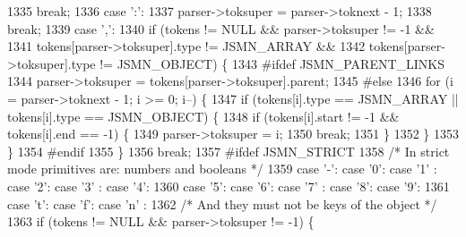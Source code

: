 \begin{DoxyCode}
1335                 \textcolor{keywordflow}{break};
1336             \textcolor{keywordflow}{case} \textcolor{charliteral}{':'}:
1337                 parser->toksuper = parser->toknext - 1;
1338                 \textcolor{keywordflow}{break};
1339             \textcolor{keywordflow}{case} \textcolor{charliteral}{','}:
1340                 \textcolor{keywordflow}{if} (tokens != NULL && parser->toksuper != -1 &&
1341                         tokens[parser->toksuper].type != JSMN_ARRAY &&
1342                         tokens[parser->toksuper].type != JSMN_OBJECT) \{
1343 \textcolor{preprocessor}{#ifdef JSMN\_PARENT\_LINKS}
1344                     parser->toksuper = tokens[parser->toksuper].parent;
1345 \textcolor{preprocessor}{#else}
1346                     \textcolor{keywordflow}{for} (i = parser->toknext - 1; i >= 0; i--) \{
1347                         \textcolor{keywordflow}{if} (tokens[i].type == JSMN_ARRAY || tokens[i].type == 
      JSMN_OBJECT) \{
1348                             \textcolor{keywordflow}{if} (tokens[i].start != -1 && tokens[i].end == -1) \{
1349                                 parser->toksuper = i;
1350                                 \textcolor{keywordflow}{break};
1351                             \}
1352                         \}
1353                     \}
1354 \textcolor{preprocessor}{#endif}
1355                 \}
1356                 \textcolor{keywordflow}{break};
1357 \textcolor{preprocessor}{#ifdef JSMN\_STRICT}
1358             \textcolor{comment}{/* In strict mode primitives are: numbers and booleans */}
1359             \textcolor{keywordflow}{case} \textcolor{charliteral}{'-'}: \textcolor{keywordflow}{case} \textcolor{charliteral}{'0'}: \textcolor{keywordflow}{case} \textcolor{charliteral}{'1'} : \textcolor{keywordflow}{case} \textcolor{charliteral}{'2'}: \textcolor{keywordflow}{case} \textcolor{charliteral}{'3'} : \textcolor{keywordflow}{case} \textcolor{charliteral}{'4'}:
1360             \textcolor{keywordflow}{case} \textcolor{charliteral}{'5'}: \textcolor{keywordflow}{case} \textcolor{charliteral}{'6'}: \textcolor{keywordflow}{case} \textcolor{charliteral}{'7'} : \textcolor{keywordflow}{case} \textcolor{charliteral}{'8'}: \textcolor{keywordflow}{case} \textcolor{charliteral}{'9'}:
1361             \textcolor{keywordflow}{case} \textcolor{charliteral}{'t'}: \textcolor{keywordflow}{case} \textcolor{charliteral}{'f'}: \textcolor{keywordflow}{case} \textcolor{charliteral}{'n'} :
1362                 \textcolor{comment}{/* And they must not be keys of the object */}
1363                 \textcolor{keywordflow}{if} (tokens != NULL && parser->toksuper != -1) \{

\end{DoxyCode}
